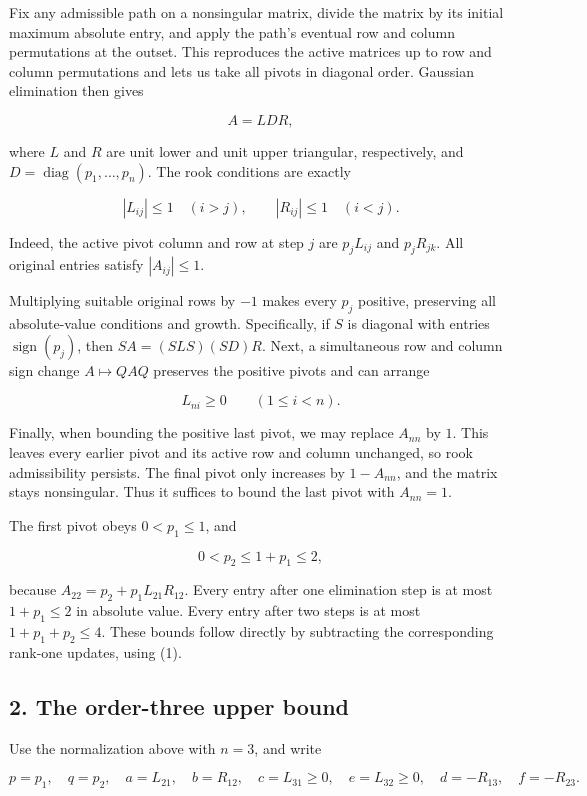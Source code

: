 \documentclass[10pt,a4paper]{article}
\begin{document}
Fix any admissible path on a nonsingular matrix, divide the matrix by
its initial maximum absolute entry, and apply the path's eventual row
and column permutations at the outset. This reproduces the active
matrices up to row and column permutations and lets us take all pivots
in diagonal order. Gaussian elimination then gives

\[
A=LDR,
\]

where \(L\) and \(R\) are unit lower and unit upper triangular,
respectively, and \(D=\operatorname{diag}(p_1,\ldots,p_n)\). The rook
conditions are exactly

\[
|L_{ij}|\le1\quad(i>j),\qquad |R_{ij}|\le1\quad(i<j).
\tag{1}
\]

Indeed, the active pivot column and row at step \(j\) are \(p_j L_{ij}\)
and \(p_jR_{jk}\). All original entries satisfy \(|A_{ij}|\le1\).

Multiplying suitable original rows by \(-1\) makes every \(p_j\)
positive, preserving all absolute-value conditions and growth.
Specifically, if \(S\) is diagonal with entries
\(\operatorname{sign}(p_j)\), then \(SA=(SLS)(SD)R\). Next, a
simultaneous row and column sign change \(A\mapsto QAQ\) preserves the
positive pivots and can arrange

\[
L_{ni}\ge0\qquad(1\le i<n).
\tag{2}
\]

Finally, when bounding the positive last pivot, we may replace
\(A_{nn}\) by \(1\). This leaves every earlier pivot and its active row
and column unchanged, so rook admissibility persists. The final pivot
only increases by \(1-A_{nn}\), and the matrix stays nonsingular. Thus
it suffices to bound the last pivot with \(A_{nn}=1\).

The first pivot obeys \(0<p_1\le1\), and

\[
0<p_2\le1+p_1\le2,
\tag{3}
\]

because \(A_{22}=p_2+p_1L_{21}R_{12}\). Every entry after one
elimination step is at most \(1+p_1\le2\) in absolute value. Every entry
after two steps is at most \(1+p_1+p_2\le4\). These bounds follow
directly by subtracting the corresponding rank-one updates, using (1).

\subsection{2. The order-three upper
bound}\label{the-order-three-upper-bound}

Use the normalization above with \(n=3\), and write

\[
p=p_1,\quad q=p_2,\quad a=L_{21},\quad b=R_{12},
\quad c=L_{31}\ge0,\quad e=L_{32}\ge0,
\quad d=-R_{13},\quad f=-R_{23}.
\]
\end{document}
